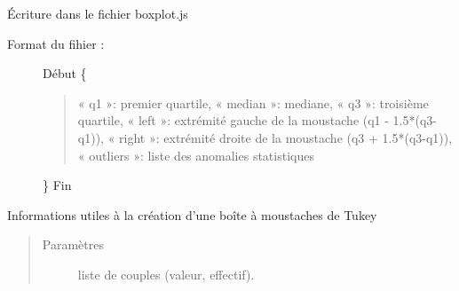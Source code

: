 \documentclass[letterpaper,10pt,french]{sphinxmanual}
\begin{document}

\begin{fulllineitems}
\label{\detokenize{addQuantitativesDiscretes:add.addQuantitativesDiscretes.infoBoiteTukey}}
Écriture dans le fichier boxplot.js
\begin{description}
\item[{Format du fihier :}] \leavevmode
Début
\{
\begin{quote}

« q1 »: premier quartile,
« median »: mediane,
« q3 »: troisième quartile,
« left »: extrémité gauche de la moustache (q1 - 1.5*(q3-q1)),
« right »: extrémité droite de la moustache (q3 + 1.5*(q3-q1)),
« outliers »: liste des anomalies statistiques
\end{quote}

\}
Fin

\end{description}

Informations utiles à la création d’une boîte à moustaches de Tukey
\begin{quote}\begin{description}
\item[{Paramètres}] \leavevmode
{} \textendash{} liste de couples (valeur, effectif).

\end{description}\end{quote}

\end{fulllineitems}

\end{document}
